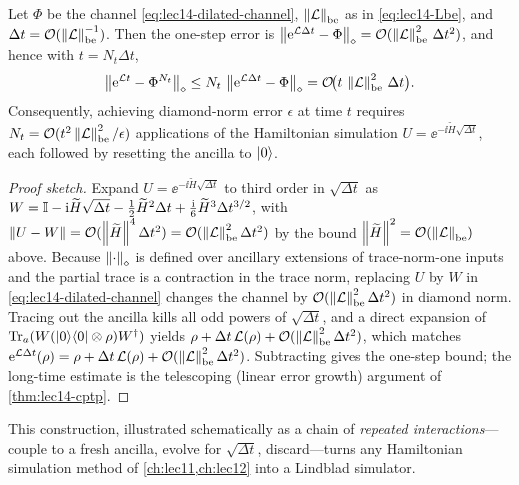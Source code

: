 \begin{theorem}
\label{thm:lec14-dilation}
Let $\Phi$ be the channel \eqref{eq:lec14-dilated-channel}, $\left\lVert \mathcal L \right\rVert_{\mathrm{be}}$ as
in \eqref{eq:lec14-Lbe}, and $\Delta t=\mathcal O(\left\lVert \mathcal L \right\rVert_{\mathrm{be}}^{-1})$. Then
the one-step error is $\left\lVert \mathrm{e}^{\mathcal L\Delta t}-\Phi \right\rVert_\diamond=\mathcal O
(\left\lVert \mathcal L \right\rVert_{\mathrm{be}}^2\,\Delta t^2)$, and hence with $t=N_t\Delta t$,
\begin{equation}
  \left\lVert \mathrm{e}^{\mathcal L t}-\Phi^{N_t} \right\rVert_\diamond
  \le N_t\,\left\lVert \mathrm{e}^{\mathcal L\Delta t}-\Phi \right\rVert_\diamond
  =\mathcal O\!\bigl(t\,\left\lVert \mathcal L \right\rVert_{\mathrm{be}}^2\,\Delta t\bigr).
  \label{eq:lec14-dilation-error}
\end{equation}
Consequently, achieving diamond-norm error $\epsilon$ at time $t$ requires
$N_t=\mathcal O(t^2\left\lVert \mathcal L \right\rVert_{\mathrm{be}}^2/\epsilon)$ applications of the Hamiltonian
simulation $U=\ee^{-\ii\widetilde H\sqrt{\Delta t}}$, each followed by resetting the ancilla to
$\ket0$.
\end{theorem}

\begin{proof}[Proof sketch]
Expand $U=\ee^{-\ii\widetilde H\sqrt{\Delta t}}$ to third order in $\sqrt{\Delta t}$ as $W=\mathbb{I}
-\mathrm{i}\widetilde H\sqrt{\Delta t}-\tfrac12\widetilde H^2\Delta t+\tfrac{\mathrm{i}}6\widetilde H^3
\Delta t^{3/2}$, with $\left\lVert U-W \right\rVert=\mathcal O(\left\lVert \widetilde H \right\rVert^4\Delta t^2)=\mathcal O
(\left\lVert \mathcal L \right\rVert_{\mathrm{be}}^2\Delta t^2)$ by the bound $\left\lVert \widetilde H \right\rVert^2=\mathcal O
(\left\lVert \mathcal L \right\rVert_{\mathrm{be}})$ above. Because $\left\lVert \cdot \right\rVert_\diamond$ is defined over ancillary
extensions of trace-norm-one inputs and the partial trace is a contraction in the trace norm,
replacing $U$ by $W$ in \eqref{eq:lec14-dilated-channel} changes the channel by $\mathcal O
(\left\lVert \mathcal L \right\rVert_{\mathrm{be}}^2\Delta t^2)$ in diamond norm. Tracing out the ancilla kills all
odd powers of $\sqrt{\Delta t}$, and a direct expansion of $\operatorname{Tr}_a(W(\ket{0}\!\bra{0}\otimes\rho)W^{\dagger})$
yields $\rho+\Delta t\,\mathcal L(\rho)+\mathcal O(\left\lVert \mathcal L \right\rVert_{\mathrm{be}}^2\Delta t^2)$,
which matches $\mathrm{e}^{\mathcal L\Delta t}(\rho)=\rho+\Delta t\,\mathcal L(\rho)+\mathcal O
(\left\lVert \mathcal L \right\rVert_{\mathrm{be}}^2\Delta t^2)$. Subtracting gives the one-step bound; the
long-time estimate is the telescoping (linear error growth) argument of \cref{thm:lec14-cptp}.
\end{proof}

This construction, illustrated schematically as a chain of \emph{repeated interactions}---couple
to a fresh ancilla, evolve for $\sqrt{\Delta t}$, discard---turns any Hamiltonian simulation
method of \cref{ch:lec11,ch:lec12} into a Lindblad simulator.

